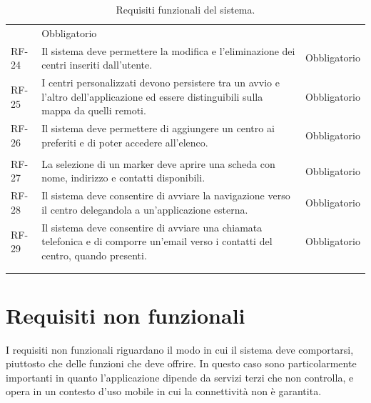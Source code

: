 \begin{longtable}{@{}P{1.4cm} P{9.1cm} P{2.3cm}@{}}
& Obbligatorio \tabularnewline
RF-24 & Il sistema deve permettere la modifica e l'eliminazione dei centri inseriti dall'utente.
& Obbligatorio \tabularnewline
RF-25 & I centri personalizzati devono persistere tra un avvio e l'altro dell'applicazione ed essere distinguibili sulla mappa da quelli remoti.
& Obbligatorio \tabularnewline
RF-26 & Il sistema deve permettere di aggiungere un centro ai preferiti e di poter accedere all'elenco.
& Obbligatorio \tabularnewline
\addlinespace
{} \tabularnewline
RF-27 & La selezione di un marker deve aprire una scheda con nome, indirizzo e contatti disponibili.
& Obbligatorio \tabularnewline
RF-28 & Il sistema deve consentire di avviare la navigazione verso il centro delegandola a un'applicazione esterna.
& Obbligatorio \tabularnewline
RF-29 & Il sistema deve consentire di avviare una chiamata telefonica e di comporre un'email verso i contatti del centro, quando presenti.
& Obbligatorio \tabularnewline
\addlinespace
{} \tabularnewline
\caption{Requisiti funzionali del sistema.}
\label{tab:requisiti-funzionali}
\end{longtable}
\normalsize

\section{Requisiti non funzionali}\label{sec:requisiti-non-funzionali}

I requisiti non funzionali riguardano il modo in cui il sistema deve comportarsi, piuttosto che delle funzioni che deve offrire.
In questo caso sono particolarmente importanti in quanto l'applicazione dipende da servizi terzi che non controlla, e
opera in un contesto d'uso mobile in cui la connettività non è garantita.

